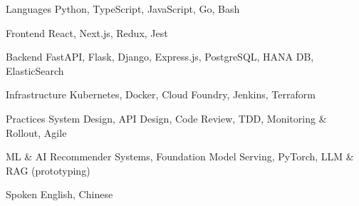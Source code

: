 

\begin{cvskills}

  \cvskill
    {Languages} %
    {Python, TypeScript, JavaScript, Go, Bash} %

  \cvskill
    {Frontend} %
    {React, Next.js, Redux, Jest} %

  \cvskill
    {Backend} %
    {FastAPI, Flask, Django, Express.js, PostgreSQL, HANA DB, ElasticSearch} %

  \cvskill
    {Infrastructure} %
    {Kubernetes, Docker, Cloud Foundry, Jenkins, Terraform} %

  \cvskill
    {Practices} %
    {System Design, API Design, Code Review, TDD, Monitoring \& Rollout, Agile} %

  \cvskill
    {ML \& AI} %
    {Recommender Systems, Foundation Model Serving, PyTorch, LLM \& RAG (prototyping)} %

  \cvskill
    {Spoken} %
    {English, Chinese} %


\end{cvskills}
